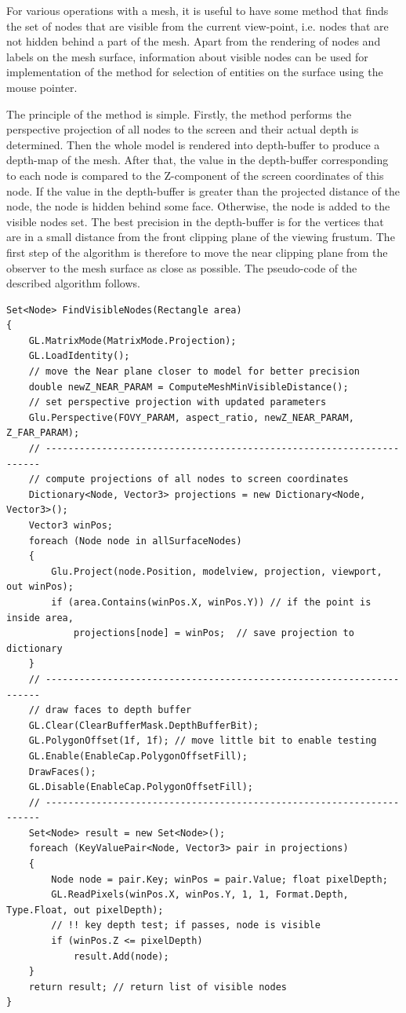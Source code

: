 For various operations with a mesh, it is useful to have some method that finds the set of nodes that are visible from the current view-point, i.e. nodes that are not hidden behind a part of the mesh. Apart from the rendering of nodes and labels on the mesh surface, information about visible nodes can be used for implementation of the method for selection of entities on the surface using the mouse pointer.

The principle of the method is simple. Firstly, the method performs the perspective projection of all nodes to the screen and their actual depth is determined. Then the whole model is rendered into depth-buffer to produce a depth-map of the mesh. After that, the value in the depth-buffer corresponding to each node is compared to the Z-component of the screen coordinates of this node. If the value in the depth-buffer is greater than the projected distance of the node, the node is hidden behind some face. Otherwise, the node is added to the visible nodes set. The best precision in the depth-buffer is for the vertices that are in a small distance from the front clipping plane of the viewing frustum. The first step of the algorithm is therefore to move the near clipping plane from the observer to the mesh surface as close as possible. The pseudo-code of the described algorithm follows.

\begin{lstlisting}
Set<Node> FindVisibleNodes(Rectangle area)
{
	GL.MatrixMode(MatrixMode.Projection);
	GL.LoadIdentity();
	// move the Near plane closer to model for better precision
	double newZ_NEAR_PARAM = ComputeMeshMinVisibleDistance();
	// set perspective projection with updated parameters
	Glu.Perspective(FOVY_PARAM, aspect_ratio, newZ_NEAR_PARAM, Z_FAR_PARAM);
	// ---------------------------------------------------------------------
	// compute projections of all nodes to screen coordinates
	Dictionary<Node, Vector3> projections = new Dictionary<Node, Vector3>();
	Vector3 winPos;
	foreach (Node node in allSurfaceNodes)
	{
		Glu.Project(node.Position, modelview, projection, viewport, out winPos);
		if (area.Contains(winPos.X, winPos.Y)) // if the point is inside area,
			projections[node] = winPos;  // save projection to dictionary
	}
	// ---------------------------------------------------------------------
	// draw faces to depth buffer
	GL.Clear(ClearBufferMask.DepthBufferBit);
	GL.PolygonOffset(1f, 1f); // move little bit to enable testing
	GL.Enable(EnableCap.PolygonOffsetFill);
	DrawFaces();
	GL.Disable(EnableCap.PolygonOffsetFill);
	// ---------------------------------------------------------------------
	Set<Node> result = new Set<Node>();
	foreach (KeyValuePair<Node, Vector3> pair in projections)
	{
		Node node = pair.Key; winPos = pair.Value; float pixelDepth;
		GL.ReadPixels(winPos.X, winPos.Y, 1, 1, Format.Depth, Type.Float, out pixelDepth);
		// !! key depth test; if passes, node is visible
		if (winPos.Z <= pixelDepth)
			result.Add(node);
	}
	return result; // return list of visible nodes
}
\end{lstlisting}

